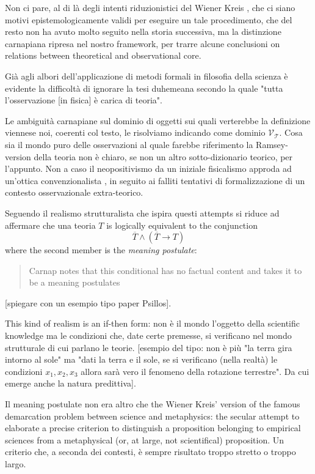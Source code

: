 Non ci pare, al di là degli intenti riduzionistici del Wiener Kreis \cite{Weinb}, che ci siano motivi epistemologicamente validi per eseguire un tale procedimento, che del resto non ha avuto molto seguito nella storia successiva, ma la distinzione carnapiana ripresa nel nostro framework, per trarre alcune conclusioni on relations between theoretical and observational core.

Già agli albori dell'applicazione di metodi formali in filosofia della scienza è evidente la difficoltà di ignorare la tesi duhemeana secondo la quale "tutta l'osservazione [in fisica] è carica di teoria". 

Le ambiguità carnapiane sul dominio di oggetti sui quali verterebbe la definizione viennese noi, coerenti col testo, le risolviamo indicando come dominio $\mathcal{V_T}$. Cosa sia il mondo puro delle osservazioni al quale farebbe riferimento la Ramsey-version della teoria non è chiaro, se non un altro sotto-dizionario teorico, per l'appunto. Non a caso il neopositivismo da un iniziale fisicalismo approda ad un'ottica convenzionalista \cite{?}, in seguito ai falliti tentativi di formalizzazione di un contesto osservazionale extra-teorico. 

Seguendo \cite{psillos} il realismo strutturalista che ispira questi attempts si riduce ad affermare che una teoria $T$ is logically equivalent to the conjunction
\[\overline{T} \land (\overline{T} \rightarrow T)
\] where the second member is the \emph{meaning postulate}:
\begin{quotation}
	Carnap notes that this conditional has no factual content and takes it to be a meaning postulates \cite{psillos}
\end{quotation}
[spiegare con un esempio tipo paper Psillos].

This kind of realism is an if-then form: non è il mondo l'oggetto della scientific knowledge ma le condizioni che, date certe premesse, si verificano nel mondo strutturale di cui parlano le teorie. [esempio del tipo: non è più "la terra gira intorno al sole" ma "dati la terra e il sole, se si verificano (nella realtà) le condizioni $x_1,x_2,x_3$ allora sarà vero il fenomeno della rotazione terrestre". Da cui emerge anche la natura predittiva]. 

Il meaning postulate non era altro che the Wiener Kreis' version of the famous demarcation problem between science and metaphysics: the secular attempt to elaborate a precise criterion to distinguish a proposition belonging to empirical sciences from a metaphysical (or, at large, not scientifical) proposition. Un criterio che, a seconda dei contesti, è sempre risultato troppo stretto o troppo largo. 

